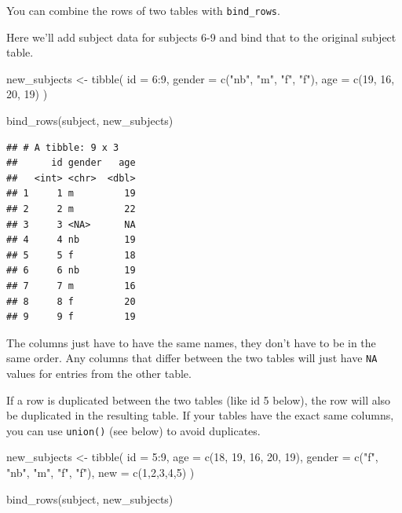\documentclass[
  oneside]{book}
\newenvironment{Shaded}{\begin{snugshade}}{\end{snugshade}}
\newcommand{\AttributeTok}[1]{\textcolor[rgb]{0.77,0.63,0.00}{#1}}
\newcommand{\DecValTok}[1]{\textcolor[rgb]{0.00,0.00,0.81}{#1}}
\newcommand{\FunctionTok}[1]{\textcolor[rgb]{0.00,0.00,0.00}{#1}}
\newcommand{\NormalTok}[1]{#1}
\newcommand{\OtherTok}[1]{\textcolor[rgb]{0.56,0.35,0.01}{#1}}
\newcommand{\SpecialCharTok}[1]{\textcolor[rgb]{0.00,0.00,0.00}{#1}}
\newcommand{\StringTok}[1]{\textcolor[rgb]{0.31,0.60,0.02}{#1}}
\begin{document}
You can combine the rows of two tables with \texttt{bind\_rows}.

Here we'll add subject data for subjects 6-9 and bind that to the original subject table.

\begin{Shaded}
\begin{Highlighting}[]
\NormalTok{new\_subjects }\OtherTok{\textless{}{-}} \FunctionTok{tibble}\NormalTok{(}
  \AttributeTok{id =} \DecValTok{6}\SpecialCharTok{:}\DecValTok{9}\NormalTok{,}
  \AttributeTok{gender =} \FunctionTok{c}\NormalTok{(}\StringTok{"nb"}\NormalTok{, }\StringTok{"m"}\NormalTok{, }\StringTok{"f"}\NormalTok{, }\StringTok{"f"}\NormalTok{),}
  \AttributeTok{age =} \FunctionTok{c}\NormalTok{(}\DecValTok{19}\NormalTok{, }\DecValTok{16}\NormalTok{, }\DecValTok{20}\NormalTok{, }\DecValTok{19}\NormalTok{)}
\NormalTok{)}

\FunctionTok{bind\_rows}\NormalTok{(subject, new\_subjects)}
\end{Highlighting}
\end{Shaded}

\begin{verbatim}
## # A tibble: 9 x 3
##      id gender   age
##   <int> <chr>  <dbl>
## 1     1 m         19
## 2     2 m         22
## 3     3 <NA>      NA
## 4     4 nb        19
## 5     5 f         18
## 6     6 nb        19
## 7     7 m         16
## 8     8 f         20
## 9     9 f         19
\end{verbatim}

The columns just have to have the same names, they don't have to be in the same order. Any columns that differ between the two tables will just have \texttt{NA} values for entries from the other table.

If a row is duplicated between the two tables (like id 5 below), the row will also be duplicated in the resulting table. If your tables have the exact same columns, you can use \texttt{union()} (see below) to avoid duplicates.

\begin{Shaded}
\begin{Highlighting}[]
\NormalTok{new\_subjects }\OtherTok{\textless{}{-}} \FunctionTok{tibble}\NormalTok{(}
  \AttributeTok{id =} \DecValTok{5}\SpecialCharTok{:}\DecValTok{9}\NormalTok{,}
  \AttributeTok{age =} \FunctionTok{c}\NormalTok{(}\DecValTok{18}\NormalTok{, }\DecValTok{19}\NormalTok{, }\DecValTok{16}\NormalTok{, }\DecValTok{20}\NormalTok{, }\DecValTok{19}\NormalTok{),}
  \AttributeTok{gender =} \FunctionTok{c}\NormalTok{(}\StringTok{"f"}\NormalTok{, }\StringTok{"nb"}\NormalTok{, }\StringTok{"m"}\NormalTok{, }\StringTok{"f"}\NormalTok{, }\StringTok{"f"}\NormalTok{),}
  \AttributeTok{new =} \FunctionTok{c}\NormalTok{(}\DecValTok{1}\NormalTok{,}\DecValTok{2}\NormalTok{,}\DecValTok{3}\NormalTok{,}\DecValTok{4}\NormalTok{,}\DecValTok{5}\NormalTok{)}
\NormalTok{)}

\FunctionTok{bind\_rows}\NormalTok{(subject, new\_subjects)}
\end{Highlighting}
\end{Shaded}
\end{document}
